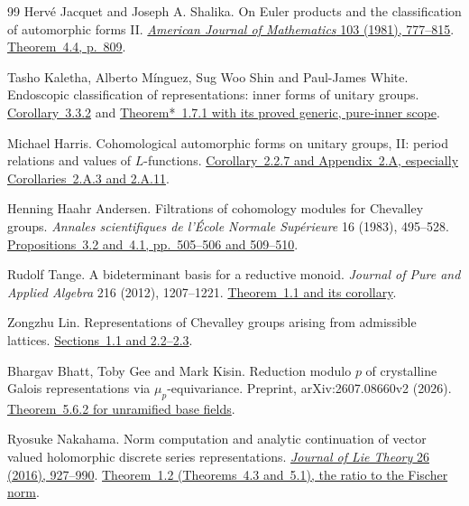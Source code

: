 \begin{thebibliography}{99}
Herv\'e Jacquet and Joseph A. Shalika.
On Euler products and the classification of automorphic forms II.
\href{https://doi.org/10.2307/2374050}
{\emph{American Journal of Mathematics} 103 (1981), 777--815}.
\href{https://www.math.columbia.edu/~hj/On\%20Euler\%20products\%20II.pdf\#page=34}
{Theorem~4.4, p.~809}.

Tasho Kaletha, Alberto M\'inguez, Sug Woo Shin and Paul-James White.
Endoscopic classification of representations: inner forms of unitary groups.
\href{https://public.websites.umich.edu/~kaletha/unitary.pdf\#page=150}
{Corollary~3.3.2} and
\href{https://public.websites.umich.edu/~kaletha/unitary.pdf\#page=89}
{Theorem*~1.7.1 with its proved generic, pure-inner scope}.

Michael Harris.
Cohomological automorphic forms on unitary groups, II:
period relations and values of \(L\)-functions.
\href{https://webusers.imj-prg.fr/~michael.harris/periodrelations.pdf\#page=25}
{Corollary~2.2.7 and Appendix~2.A, especially Corollaries~2.A.3 and 2.A.11}.

Henning Haahr Andersen.
Filtrations of cohomology modules for Chevalley groups.
\emph{Annales scientifiques de l'\'Ecole Normale Sup\'erieure}
16 (1983), 495--528.
\href{https://www.numdam.org/item/10.24033/asens.1458.pdf\#page=16}
{Propositions~3.2 and~4.1, pp.~505--506 and 509--510}.

Rudolf Tange.
A bideterminant basis for a reductive monoid.
\emph{Journal of Pure and Applied Algebra} 216 (2012), 1207--1221.
\href{https://rtange.github.io/research/tableaux.pdf\#page=4}
{Theorem~1.1 and its corollary}.

Zongzhu Lin.
Representations of Chevalley groups arising from admissible lattices.
\href{https://www.math.ksu.edu/~zlin/research/adm.pdf\#page=3}
{Sections~1.1 and 2.2--2.3}.

Bhargav Bhatt, Toby Gee and Mark Kisin.
Reduction modulo \(p\) of crystalline Galois representations via
\(\mu_p\)-equivariance. Preprint, arXiv:2607.08660v2 (2026).
\href{https://arxiv.org/pdf/2607.08660v2\#page=77}
{Theorem~5.6.2 for unramified base fields}.

Ryosuke Nakahama.
Norm computation and analytic continuation of vector valued
holomorphic discrete series representations.
\href{https://doi.org/10.5802/jolt.919}{\emph{Journal of Lie Theory}
26 (2016), 927--990}.
\href{https://arxiv.org/pdf/1506.05919\#page=5}
{Theorem~1.2 (Theorems~4.3 and~5.1), the ratio to the Fischer norm}.


\end{thebibliography}
